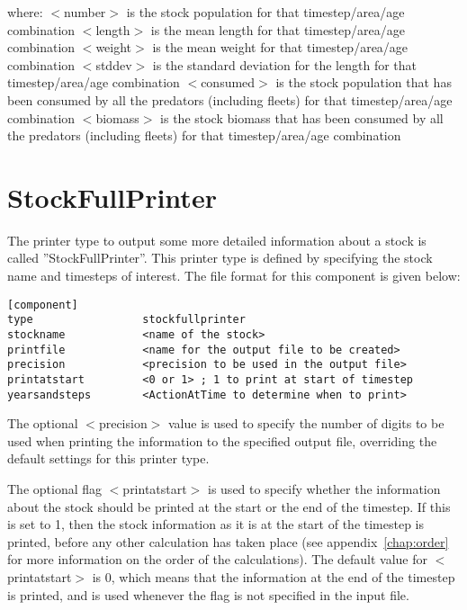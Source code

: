 \documentclass[10pt,twoside]{book}
\begin{document}
where:\newline
$<$number$>$ is the stock population for that timestep/area/age combination\newline
$<$length$>$ is the mean length for that timestep/area/age combination\newline
$<$weight$>$ is the mean weight for that timestep/area/age combination\newline
$<$stddev$>$ is the standard deviation for the length for that timestep/area/age combination\newline
$<$consumed$>$ is the stock population that has been consumed by all the predators (including fleets) for that timestep/area/age combination\newline
$<$biomass$>$ is the stock biomass that has been consumed by all the predators (including fleets) for that timestep/area/age combination

\section{StockFullPrinter}\label{sec:stockfullprinter}
The printer type to output some more detailed information about a stock is called ''StockFullPrinter''.  This printer type is defined by specifying the stock name and timesteps of interest.  The file format for this component is given below:

{\small\begin{verbatim}
[component]
type                 stockfullprinter
stockname            <name of the stock>
printfile            <name for the output file to be created>
precision            <precision to be used in the output file>
printatstart         <0 or 1> ; 1 to print at start of timestep
yearsandsteps        <ActionAtTime to determine when to print>
\end{verbatim}}

The optional $<$precision$>$ value is used to specify the number of digits to be used when printing the information to the specified output file, overriding the default settings for this printer type.

\bigskip
The optional flag $<$printatstart$>$ is used to specify whether the information about the stock should be printed at the start or the end of the timestep.  If this is set to 1, then the stock information as it is at the start of the timestep is printed, before any other calculation has taken place (see appendix~\ref{chap:order} for more information on the order of the calculations).  The default value for $<$printatstart$>$ is 0, which means that the information at the end of the timestep is printed, and is used whenever the flag is not specified in the input file.
\end{document}
